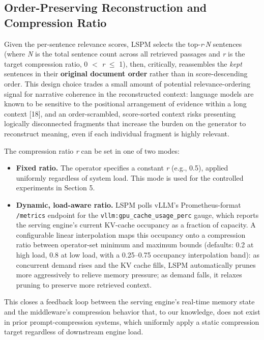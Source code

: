 \subsection{Order-Preserving Reconstruction and Compression Ratio}
Given the per-sentence relevance scores, LSPM selects the top-\textit{r}$\cdot$\textit{N} sentences (where \textit{N} is the total sentence count across all retrieved passages and \textit{r} is the target compression ratio, 0 $<$ \textit{r} $\leq$ 1), then, critically, reassembles the \textit{kept} sentences in their \textbf{original document order} rather than in score-descending order. This design choice trades a small amount of potential relevance-ordering signal for narrative coherence in the reconstructed context: language models are known to be sensitive to the positional arrangement of evidence within a long context [18], and an order-scrambled, score-sorted context risks presenting logically disconnected fragments that increase the burden on the generator to reconstruct meaning, even if each individual fragment is highly relevant.

The compression ratio \textit{r} can be set in one of two modes:

\begin{itemize}
\item \textbf{Fixed ratio.} The operator specifies a constant \textit{r} (e.g., 0.5), applied uniformly regardless of system load. This mode is used for the controlled experiments in Section 5.
\item \textbf{Dynamic, load-aware ratio.} LSPM polls vLLM's Prometheus-format \texttt{/metrics} endpoint for the \texttt{vllm:gpu\_cache\_usage\_perc} gauge, which reports the serving engine's current KV-cache occupancy as a fraction of capacity. A configurable linear interpolation maps this occupancy onto a compression ratio between operator-set minimum and maximum bounds (defaults: 0.2 at high load, 0.8 at low load, with a 0.25--0.75 occupancy interpolation band): as concurrent demand rises and the KV cache fills, LSPM automatically prunes more aggressively to relieve memory pressure; as demand falls, it relaxes pruning to preserve more retrieved context.
\end{itemize}
This closes a feedback loop between the serving engine's real-time memory state and the middleware's compression behavior that, to our knowledge, does not exist in prior prompt-compression systems, which uniformly apply a static compression target regardless of downstream engine load.

